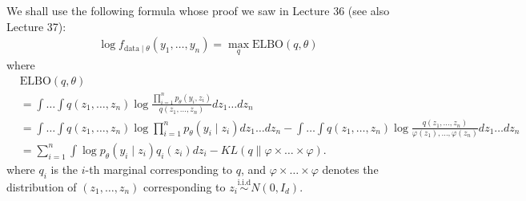 \documentclass{scrartcl}
\begin{document}
We shall use the following formula whose proof we saw in Lecture 36
(see also Lecture 37): 
\begin{align}\label{evid_elbo}
  \log f_{\text{data} \mid \theta}(y_1, \dots, y_n) = \max_{q}
  \text{ELBO}(q, \theta)
\end{align}
where
\begin{align*}
  & \text{ELBO}(q, \theta) \\ &= \int \dots \int q(z_1, \dots, z_n) \log
  \frac{\prod_{i=1}^np_{\theta}(y_i,  z_i)}{q(z_1, \dots, z_n)}
                           dz_1 \dots dz_n \\
  &= \int \dots \int q(z_1, \dots, z_n) \log \prod_{i=1}^n
    p_{\theta}(y_i \mid z_i) dz_1 \dots dz_n - \int \dots \int q(z_1,
    \dots, z_n) \log \frac{q(z_1, \dots, z_n)}{\varphi(z_1), \dots,
    \varphi(z_n)} dz_1 \dots dz_n \\
  &= \sum_{i=1}^n \int \log p_{\theta}(y_i \mid z_i) q_i(z_i) dz_i -
    KL(q \| \varphi \times \dots \times \varphi).
\end{align*}
where $q_i$ is the $i$-th marginal corresponding to $q$, and $\varphi
\times \dots \times \varphi$ denotes the distribution of $(z_1, \dots,
z_n)$ corresponding to $z_i \overset{\text{i.i.d}}{\sim} N(0, I_d)$.
\end{document}
